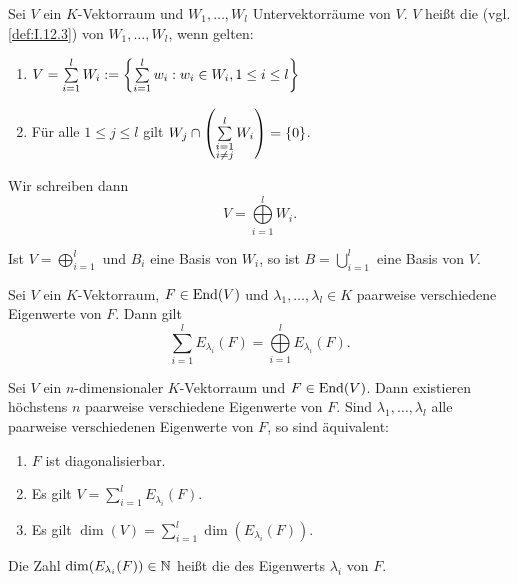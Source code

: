 \begin{definition}
	\label{def:I.16.17}
	Sei $V$ ein $K$-Vektorraum und $W_1,\dots,W_l$ Untervektorräume von $V$.
	$V$ heißt die  (vgl. \autoref{def:I.12.3}) von $W_1,\dots,W_l$, wenn gelten:
	\begin{enumerate}[(1)]
		\item $V = \sum\limits_{i=1}^{l} W_i := \left\{\sum\limits_{i=1}^{l} w_i : w_i \in W_i, 1 \leq i \leq l\right\}$
		\item Für alle $1 \leq j \leq l$ gilt $W_j \cap \left(\sum\limits_{\substack{i = 1 \\ i \neq j}}^{l} W_i\right) = \{0\}$.
	\end{enumerate}
	Wir schreiben dann
	\[
		V = \bigoplus\limits_{i=1}^l W_i.
	\]
\end{definition}

\begin{lemma}
	\label{lemma:I.16.18}
	Ist $V = \bigoplus\limits_{i=1}^{l}$ und $B_i$ eine Basis von $W_i$, so ist $B = \bigcup\limits_{i=1}^{l}$ eine Basis von $V$.
\end{lemma}

\begin{satz}
	\label{satz:I.16.19}
	Sei $V$ ein $K$-Vektorraum, $F \in \operatorname{End}(V)$ und $\lambda_1,\dots,\lambda_l \in K$ paarweise verschiedene Eigenwerte von $F$.
	Dann gilt
	\[
		\sum\limits_{i=1}^l E_{\lambda_i}(F) = \bigoplus\limits_{i=1}^{l} E_{\lambda_i}(F).
	\]
\end{satz}

\begin{satz}
	\label{satz:I.16.20}
	Sei $V$ ein $n$-dimensionaler $K$-Vektorraum und $F \in \operatorname{End}(V)$.
	Dann existieren höchstens $n$ paarweise verschiedene Eigenwerte von $F$.
	Sind $\lambda_1,\dots,\lambda_l$ alle paarweise verschiedenen Eigenwerte von $F$, so sind äquivalent:
	\begin{enumerate}[(1)]
		\item $F$ ist diagonalisierbar.
		\item Es gilt $V = \sum\limits_{i=1}^{l} E_{\lambda_i}(F)$.
		\item Es gilt $\dim(V) = \sum\limits_{i=1}^l \dim(E_{\lambda_i}(F))$.
	\end{enumerate}
\end{satz}

\begin{definition}
	\label{def:I.16.21}
	Die Zahl $\dim(E_{\lambda_i}(F)) \in \mathbb{N}$ heißt die  des Eigenwerts $\lambda_i$ von $F$.
\end{definition}
